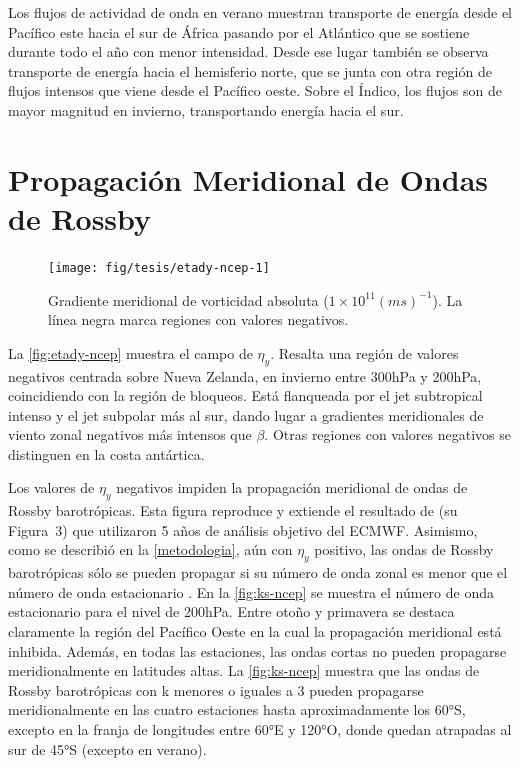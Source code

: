 \documentclass[spanish,a4paper,12pt,oneside]{book}
\begin{document}
Los flujos de actividad de onda en verano muestran transporte de energía
desde el Pacífico este hacia el sur de África pasando por el Atlántico
que se sostiene durante todo el año con menor intensidad. Desde ese
lugar también se observa transporte de energía hacia el hemisferio
norte, que se junta con otra región de flujos intensos que viene desde
el Pacífico oeste. Sobre el Índico, los flujos son de mayor magnitud en
invierno, transportando energía hacia el sur.

\hypertarget{propagacion-meridional-de-ondas-de-rossby}{%
\section{Propagación Meridional de Ondas de
Rossby}\label{propagacion-meridional-de-ondas-de-rossby}}

\begin{landscape}\begin{figure}

{\centering \texttt{[image: fig/tesis/etady-ncep-1]} 

}

\caption{Gradiente meridional de vorticidad absoluta ($1\times10^{11}(ms)^{-1}$). La línea negra marca regiones con valores negativos.}\label{fig:etady-ncep}
\end{figure}
\end{landscape}

La \autoref{fig:etady-ncep} muestra el campo de \(\eta_y\). Resalta una
región de valores negativos centrada sobre Nueva Zelanda, en invierno
entre 300hPa y 200hPa, coincidiendo con la región de bloqueos. Está
flanqueada por el jet subtropical intenso y el jet subpolar más al sur,
dando lugar a gradientes meridionales de viento zonal negativos más
intensos que \(\beta\). Otras regiones con valores negativos se
distinguen en la costa antártica.

Los valores de \(\eta_{y}\) negativos impiden la propagación meridional
de ondas de Rossby barotrópicas. Esta figura reproduce y extiende el
resultado de \citet{Berbery1992} (su Figura~3) que utilizaron 5 años de
análisis objetivo del ECMWF. Asimismo, como se describió en la
\autoref{metodologia}, aún con \(\eta_{y}\) positivo, las ondas de
Rossby barotrópicas sólo se pueden propagar si su número de onda zonal
es menor que el número de onda estacionario \citep{James}. En la
\autoref{fig:ks-ncep} se muestra el número de onda estacionario para el
nivel de 200hPa. Entre otoño y primavera se destaca claramente la región
del Pacífico Oeste en la cual la propagación meridional está inhibida.
Además, en todas las estaciones, las ondas cortas no pueden propagarse
meridionalmente en latitudes altas. La \autoref{fig:ks-ncep} muestra que
las ondas de Rossby barotrópicas con k menores o iguales a 3 pueden
propagarse meridionalmente en las cuatro estaciones hasta
aproximadamente los 60°S, excepto en la franja de longitudes entre 60°E
y 120°O, donde quedan atrapadas al sur de 45°S (excepto en verano).
\end{document}
